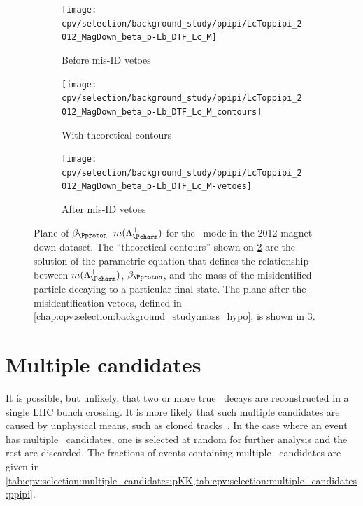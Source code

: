 \begin{figure}
  \begin{subfigure}[b]{0.5\textwidth}
    \texttt{[image: cpv/selection/background\_study/ppipi/LcToppipi\_2012\_MagDown\_beta\_p-Lb\_DTF\_Lc\_M]}
    \caption{Before mis-ID vetoes}
    \label{fig:cpv:selection:background_study:mom_asym:ppipi:before}
  \end{subfigure}
  \begin{subfigure}[b]{0.5\textwidth}
    \texttt{[image: cpv/selection/background\_study/ppipi/LcToppipi\_2012\_MagDown\_beta\_p-Lb\_DTF\_Lc\_M\_contours]}
    \caption{With theoretical contours}
    \label{fig:cpv:selection:background_study:mom_asym:ppipi:contours}
  \end{subfigure}
  \begin{subfigure}[b]{0.5\textwidth}
    \texttt{[image: cpv/selection/background\_study/ppipi/LcToppipi\_2012\_MagDown\_beta\_p-Lb\_DTF\_Lc\_M-vetoes]}
    \caption{After mis-ID vetoes}
    \label{fig:cpv:selection:background_study:mom_asym:ppipi:after}
  \end{subfigure}
  \caption{%
    Plane of $\beta_{\Pproton}$--$m(\PLambdac)$ for the \ppipi\ mode in the
    2012 magnet down dataset.
    The ``theoretical contours'' shown on
    \cref{fig:cpv:selection:background_study:mom_asym:ppipi:contours} are the
    solution of the parametric equation that defines the relationship between
    $m(\PLambdac)$, $\beta_{\Pproton}$, and the mass of the misidentified
    particle decaying to a particular final state.
    The plane after the misidentification vetoes, defined in
    \cref{chap:cpv:selection:background_study:mass_hypo}, is shown in
    \cref{fig:cpv:selection:background_study:mom_asym:ppipi:after}.
  }
  \label{fig:cpv:selection:background_study:mom_asym:ppipi}
\end{figure}

\section{Multiple candidates}
\label{chap:cpv:selection:multiple_candidates}

It is possible, but unlikely, that two or more true \LcTophh\ decays are
reconstructed in a single \ac{LHC} bunch crossing.
It is more likely that such multiple candidates are caused by unphysical means,
such as cloned tracks~\cite{LHCb-INT-2011-009}.
In the case where an event has multiple \PLambdac\ candidates, one is selected
at random for further analysis and the rest are discarded.
The fractions of events containing multiple \PLambdac\ candidates are given in
\cref{tab:cpv:selection:multiple_candidates:pKK,tab:cpv:selection:multiple_candidates:ppipi}.


